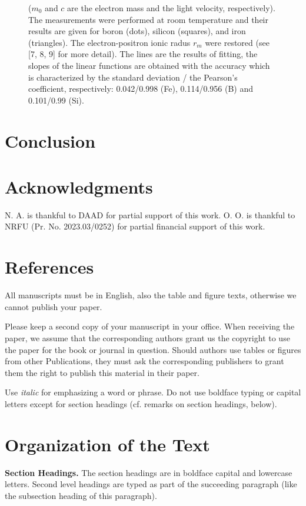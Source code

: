 \documentclass{ttp}
\begin{document}
\begin{figure}
{        ($m_0$ and $c$ are the electron mass and the light velocity, respectively).
        The measurements were performed at room temperature and their results are given
        for boron (dots), silicon (squares), and iron (triangles).
        The electron-positron ionic radus $r_m$ were restored (see [7, 8, 9] for more detail).
        The lines are the results of fitting, the slopes of the linear functions are obtained with the accuracy
        which is characterized by the standard deviation / the Pearson’s coefficient, respectively:
        0.042/0.998 (Fe), 0.114/0.956 (B) and 0.101/0.99 (Si).
}\label{fig6}
\end{figure}

\section{Conclusion}

\section{Acknowledgments}

N. A. is thankful to DAAD for partial support of this work.
O. O. is thankful to NRFU (Pr. No. 2023.03/0252) for partial financial support of this work.

\section{References}

All manuscripts must be in English, also the table and figure texts, otherwise we cannot publish your paper.

Please keep a second copy of your manuscript in your office. When receiving the paper, we assume
that the corresponding authors grant us the copyright to use the paper for the book or journal in question.
Should authors use tables or figures from other Publications, they must ask the corresponding publishers to
grant them the right to publish this material in their paper.

Use \textit{italic} for emphasizing a word or phrase.
Do not use boldface typing or capital letters except for section headings (cf. remarks on section headings, below).


\section{Organization of the Text}


\noindent \textbf{Section Headings.} The section headings are in boldface capital and lowercase letters.
Second level headings are typed as part of the succeeding paragraph (like the subsection heading of this paragraph).
\end{document}

